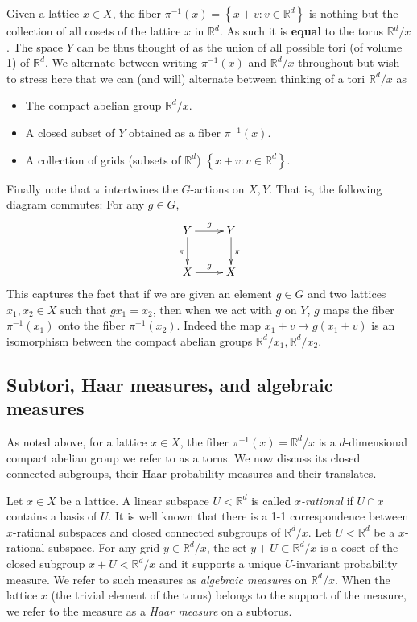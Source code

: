 \documentclass[reqno,11pt, twoside]{amsart}
\theoremstyle{plain}
\theoremstyle{definition}
\theoremstyle{definition}
\theoremstyle{remark}
\numberwithin{equation}{section}
\newcommand{\bR}{\mathbb{R}}
\newcommand\seta[1]{\left\{#1\right\}}
\begin{document}
Given a lattice $x\in X$, the fiber $\pi^{-1}(x)=\seta{x+v:v\in \bR^d}$ is nothing but the collection of all cosets of the lattice $x$ in $\bR^d$. As such it is \textbf{equal} to the torus $\bR^d/x$. The space $Y$ can be thus thought of as the union of all possible tori (of volume 1) of $\bR^d$. 
We alternate between writing $\pi^{-1}(x)$ and $\bR^d/x$ throughout but wish to stress here that we can (and will) alternate between thinking of a tori
$\bR^d/x$ as
\begin{itemize}
    \item The compact abelian group $\bR^d/x$.
    \item A closed subset of $Y$ obtained as a fiber $\pi^{-1}(x)$.
    \item A collection of grids (subsets of $\bR^d$) $\seta{x+v:v\in \bR^d}$.
\end{itemize}
Finally note that $\pi$ intertwines 
the $G$-actions on $X, Y$. That is, the following diagram commutes: For any $g\in G$,
$$ \xymatrix{
Y\ar[r]^g\ar[d]_\pi & Y\ar[d]^\pi \\
X\ar[r]^g &X
}$$
This captures the fact that if we are given an element 
$g\in G$ and two lattices $x_1,x_2\in X$ such that $gx_1 = x_2$, then when we act with $g$ on $Y$, $g$ maps the fiber $\pi^{-1}(x_1)$ onto the fiber $\pi^{-1}(x_2)$. Indeed the map $x_1+v\mapsto g(x_1+v)$ is an isomorphism between the compact abelian groups $\bR^d/x_1, \bR^d/x_2$. 
\subsection{Subtori, Haar measures, and algebraic measures}
As noted above, for a lattice $x\in X$, the fiber $\pi^{-1}(x)=\bR^d/x$ is 
a $d$-dimensional compact abelian group we refer to as a torus.
We now discuss its closed connected subgroups, their Haar probability measures and their translates.

Let $x\in X$ be a lattice. A linear subspace $U<\bR^d$ is called 
\textit{$x$-rational} if $U\cap x$ contains a basis of $U$.
It is well known that there is a 1-1 correspondence between $x$-rational subspaces and closed connected subgroups of $\bR^d/x$. Let $U<\bR^d$ be a 
$x$-rational subspace. 
For any grid
$y\in \bR^d/x$, the set $y+U\subset \bR^d/x$ is a coset of the closed subgroup $x+U<\bR^d/x$
and it supports a unique $U$-invariant probability measure. We refer to such measures as \textit{algebraic measures} on $\bR^d/x$. When the lattice $x$ (the trivial element of the torus) belongs to the support of the measure, we refer to the measure as a \textit{Haar measure} on a subtorus. 
\end{document}
